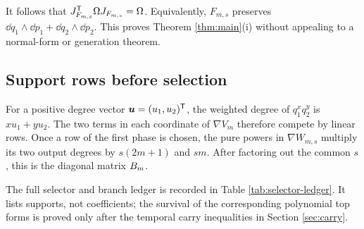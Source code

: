 \documentclass[11pt]{article}
\theoremstyle{definition}
\theoremstyle{remark}
\begin{document}
It follows that \(J_{F_{m,s}}^{\mathsf{T}}\Omega J_{F_{m,s}}=\Omega\).
Equivalently, \(F_{m,s}\) preserves
\(\dd q_1\wedge\dd p_1+\dd q_2\wedge\dd p_2\).  This proves
Theorem \ref{thm:main}(i) without appealing to a normal-form or generation
theorem.

\subsection{Support rows before selection}

For a positive degree vector \(\boldsymbol{u}=(u_1,u_2)^{\mathsf{T}}\), the weighted degree
of \(q_1^xq_2^y\) is \(xu_1+yu_2\).  The two terms in each coordinate of
\(\nabla V_m\) therefore compete by linear rows.  Once a row of the first
phase is chosen, the pure powers in \(\nabla W_{m,s}\) multiply its two
output degrees by \(s(2m+1)\) and \(sm\).  After factoring out the common
\(s\), this is the diagonal matrix \(B_m\).

The full selector and branch ledger is recorded in Table
\ref{tab:selector-ledger}.  It lists supports, not coefficients; the survival
of the corresponding polynomial top forms is proved only after the temporal
carry inequalities in Section \ref{sec:carry}.
\end{document}
